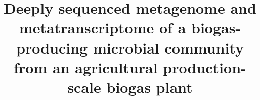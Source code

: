 \documentclass{bmcart}
\begin{document}
\begin{frontmatter}

\begin{fmbox}


\title{Deeply sequenced metagenome and metatranscriptome of a biogas-producing microbial community from an agricultural production-scale biogas plant}


\author[
   addressref={cebitec,techfak},
   email={abremges@cebitec.uni-bielefeld.de}
]{ }
\author[
   addressref={cebitec}
]{ }
\author[
   addressref={techfak}
]{ }
\author[
   addressref={cebitec}
]{ }
\author[
   addressref={cebitec}
]{ }
\author[
   addressref={cebitec}
]{ }
\author[
   addressref={cebitec}
]{ }
\author[
   addressref={cebitec},
   noteref={n1}
]{ }
\author[
   addressref={cebitec,techfak},
   corref={cebitec},
   noteref={n1},
   email={asczyrba@cebitec.uni-bielefeld.de}
]{ }



\end{fmbox}
\end{frontmatter}
\end{document}

